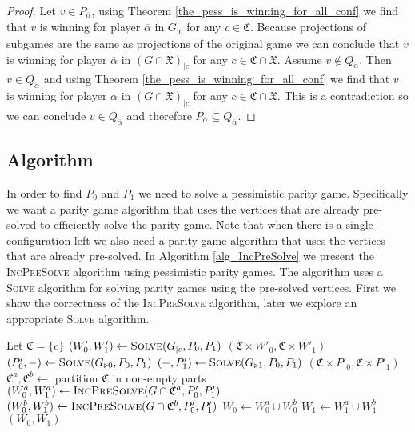 \begin{lemma}
\begin{proof}
		
		Let $v \in P_{\overline{\alpha}}$, using Theorem \ref{the_pess_is_winning_for_all_conf} we find that $v$ is winning for player $\overline{\alpha}$ in $G_{|c}$ for any $c \in \mathfrak{C}$. Because projections of subgames are the same as projections of the original game we can conclude that $v$ is winning for player $\overline{\alpha}$ in $(G \cap \mathfrak{X})_{|c}$ for any $c \in \mathfrak{C} \cap \mathfrak{X}$.	Assume $v \notin Q_{\overline{\alpha}}$. Then $v \in Q_{\alpha}$ and using Theorem \ref{the_pess_is_winning_for_all_conf} we find that $v$ is winning for player $\alpha$ in $(G \cap \mathfrak{X})_{|c}$ for any $c \in \mathfrak{C} \cap \mathfrak{X}$. This is a contradiction so we can conclude $v \in Q_{\overline{\alpha}}$ and therefore $P_{\overline{\alpha}} \subseteq Q_{\overline{\alpha}}$.
	\end{proof}
\end{lemma}
\subsection{Algorithm}
In order to find $P_0$ and $P_1$ we need to solve a pessimistic parity game. Specifically we want a parity game algorithm that uses the vertices that are already pre-solved to efficiently solve the parity game. Note that when there is a single configuration left we also need a parity game algorithm that uses the vertices that are already pre-solved. In Algorithm \ref{alg_IncPreSolve} we present the \textsc{IncPreSolve} algorithm using pessimistic parity games. The algorithm uses a \textsc{Solve} algorithm for solving parity games using the pre-solved vertices. First we show the correctness of the \textsc{IncPreSolve} algorithm, later we explore an appropriate \textsc{Solve} algorithm.
\begin{algorithm}
	\caption{$\textsc{IncPreSolve}(G = (V,V_0,V_1, E, \Omega, \mathfrak{C}, \theta), P_0,P_1)$}\label{alg_IncPreSolve}
	\begin{algorithmic}[1]
		\State Let $\mathfrak{C} = \{c\}$
		\State $(W'_0,W'_1) \gets \textsc{Solve}(G_{|c}, P_0,P_1)$
		\State \Return $(\mathfrak{C} \times W'_0, \mathfrak{C} \times W'_1)$
		\EndIf
		\State $(P'_0,-) \gets \textsc{Solve}(G_{\triangleright0}, P_0, P_1)$
		\State $(-,P'_1) \gets \textsc{Solve}(G_{\triangleright1}, P_0, P_1)$
		\State \Return $(\mathfrak{C} \times P'_0, \mathfrak{C} \times P'_1)$
		\EndIf
		\State $\mathfrak{C}^a, \mathfrak{C}^b \gets $ partition $\mathfrak{C}$ in non-empty parts
		\State $(W_0^a, W_1^a) \gets \textsc{IncPreSolve}(G \cap \mathfrak{C}^a, P'_0,P'_1)$
		\State $(W_0^b, W_1^b) \gets \textsc{IncPreSolve}(G \cap \mathfrak{C}^b, P'_0,P'_1)$
		\State $W_0 \gets W_0^a \cup W_0^b$
		\State $W_1 \gets W_1^a \cup W_1^b$
		\State \Return $(W_0,W_1)$
	\end{algorithmic}
\end{algorithm}

